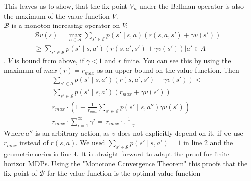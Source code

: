 This leaves us to show, that the fix point $V_n$ under the Bellman operator is also the maximum of the value function $V$.\\
$\mathcal{B}$ is a monoton increasing operator on $V$: 
\begin{equation}
    \begin{align}
        \mathcal{B}v(s) = \max_{a \in \mathcal{A}} \sum_{s' \in \mathcal{S}} p(s' \mid s,a) \left(r(s,a,s') + \gamma v(s')\right)\\
        \geq \sum_{s' \in \mathcal{S}} p(s' \mid s,a') \left(r(s,a',s') + \gamma v(s')\right) |a' \in A
    \end{align}
\end{equation}.
$V$ is bound from above, if $\gamma < 1$ and $r$ finite. You can see this by using the maximum of $max(r) = r_{max}$ as an upper bound on the value function. Then
\begin{equation}
    \begin{aligned}
        \sum_{s' \in \mathcal{S}} p(s' \mid s,a') \left(r(s,a',s') + \gamma v(s')\right) < \\
        \sum_{s' \in \mathcal{S}} p(s' \mid s,a') \left(r_{max} + \gamma v(s')\right) = \\
        r_{max} \cdot (1 + \frac{1}{r_{max}} \sum_{s' \in \mathcal{S}} p(s' \mid s,a'') \gamma v(s')) = \\
        r_{max} \cdot \sum_{i = 1}^{\infty} \gamma^i = \
        r_{max} \cdot \frac{1}{1-\gamma} 
    \end{aligned}
\end{equation}
Where $a''$ is an arbitrary action, as $v$ does not explicitly depend on it, if we use $r_{max}$ instead of $r(s,a)$. We used 
$\sum_{s' \in \mathcal{S}} p(s' \mid s,a') = 1$ in line 2 and the geometric series is line 4. It is straight forward to adapt the proof for finite 
horizon MDPs.
Using the "Monotone Convergence Theorem" this proofs that the fix point of $\mathcal{B}$ for the value function is the optimal value function.